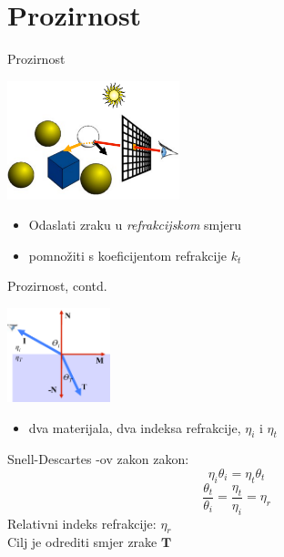 \documentclass[9pt]{beamer}
\begin{document}
\section{Prozirnost}
\begin{frame}{Prozirnost}

\begin{center}
\includegraphics[width=5cm]{slike/prozirnost_01.png}
\end{center}
\begin{itemize}
\item Odaslati zraku u \textit{refrakcijskom} smjeru
\item pomnožiti s koeficijentom refrakcije $k_t$
\end{itemize}
\end{frame}

\begin{frame}{Prozirnost, contd.}

\begin{center}
\includegraphics[width=3cm]{slike/prozirnost_02.png}
\end{center}
\begin{itemize}
\item dva materijala, dva indeksa refrakcije, $\eta_i$ i $\eta_t$
\end{itemize}
Snell-Descartes -ov zakon zakon:
$$\eta_i \theta_i = \eta_t \theta_t$$
$$\frac{\theta_t}{\theta_i} = \frac{\eta_t}{\eta_i} = \eta_r$$
Relativni indeks refrakcije: $\eta_r$\\
Cilj je odrediti smjer zrake $\mathbf{T}$
\end{frame}
\end{document}
